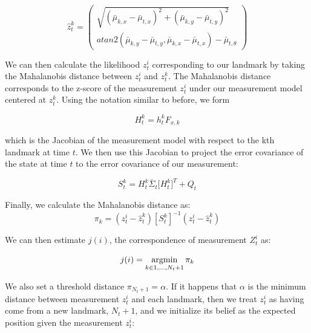 \begin{equation}
    \hat{z}_{t}^{k} = 
        \begin{pmatrix}
            \sqrt{(\bar{\mu}_{k,x} - \bar{\mu}_{t,x})^{2} 
            + (\bar{\mu}_{k,y} - \bar{\mu}_{t,y})^{2}} \\
            atan2(\bar{\mu}_{k,y} - \bar{\mu}_{t,y}, 
            \bar{\mu}_{k,x} - \bar{\mu}_{t,x}) - \bar{\mu}_{t,\theta}
        \end{pmatrix}
\end{equation}

We can then calculate the likelihood $z_{t}^i$ corresponding to our landmark by taking the Mahalanobis distance between $z_{t}^i$ and $z_{t}^k$. The Mahalanobis distance corresponds to the z-score of the measurement $z_{t}^i$ under
our measurement model centered at $z_{t}^k$. Using the notation similar to before, we form

\begin{equation}
    H_t^k = h_t^k F_{x,k}
\end{equation}

which is the Jacobian of the measurement model with respect to the kth landmark at time $t$. We then use this Jacobian to project the error covariance of the state at time $t$ to the error covariance of our measurement:

\begin{equation}
    S_t^k = H_t^k \bar{\Sigma}_{t} \big[ H_t^k\big]^T + Q_t  
\end{equation}

Finally, we calculate the Mahalanobis distance as:
\begin{equation}
    \pi_k = (z_t^i - \hat{z}_t^k) [S_t^k]^{-1} (z_t^i - \hat{z}_t^k)
\end{equation}

We can then estimate $j(i)$, the correspondence of measurement $Z_t^i$ as:

\begin{equation}
    j(i) = \operatorname*{argmin}_{k \in {1, \dots, N_t + 1}} \pi_k
\end{equation}

We also set a threshold distance $\pi_{N_t + 1} = \alpha$. If it happens that $\alpha$ is the minimum distance between measurement $z_t^i$ and each landmark, then we treat $z_t^i$ as having come from a new landmark, $N_{t} + 1$, and we initialize its belief as the expected position given the measurement $z_t^i$:

